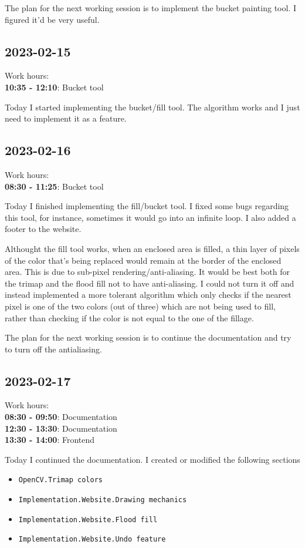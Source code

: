 \documentclass{article}
\begin{document}
The plan for the next working session is to implement the bucket painting tool.
I figured it'd be very useful.

\subsection{2023-02-15}

Work hours:\\
\textbf{10:35 - 12:10}: Bucket tool

Today I started implementing the bucket/fill tool.
The algorithm works and I just need to implement it
as a feature.

\pagebreak

\subsection{2023-02-16}

Work hours:\\
\textbf{08:30 - 11:25}: Bucket tool

Today I finished implementing the fill/bucket tool.
I fixed some bugs regarding this tool, for instance,
sometimes it would go into an infinite loop.
I also added a footer to the website.

Althought the fill tool works, when an enclosed area is filled,
a thin layer of pixels of the color that's being replaced
would remain at the border of the enclosed area.
This is due to sub-pixel rendering/anti-aliasing. It would be best both for the trimap
and the flood fill not to have anti-aliasing.
I could not turn it off and instead implemented a more tolerant
algorithm which only checks if the nearest pixel is
one of the two colors (out of three) which are not being
used to fill, rather than checking if the color is not equal
to the one of the fillage.

The plan for the next working session is to
continue the documentation and try to turn off the antialiasing.

\subsection{2023-02-17}

Work hours:\\
\textbf{08:30 - 09:50}: Documentation \\
\textbf{12:30 - 13:30}: Documentation \\
\textbf{13:30 - 14:00}: Frontend

Today I continued the documentation.
I created or modified the following sections
\begin{itemize}
    \item \texttt{OpenCV.Trimap colors}
    \item \texttt{Implementation.Website.Drawing mechanics}
    \item \texttt{Implementation.Website.Flood fill}
    \item \texttt{Implementation.Website.Undo feature}
\end{itemize}
\end{document}

